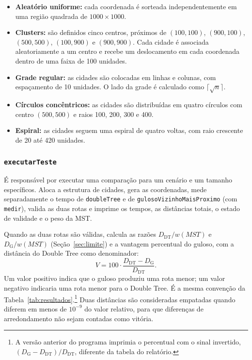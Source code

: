 \documentclass[11pt,a4paper]{article}
\renewcommand{\_}{\underscoreoriginal\allowbreak}
\begin{document}
\begin{itemize}
  \item \textbf{Aleatório uniforme:} cada coordenada é sorteada
    independentemente em uma região quadrada de $1000\times1000$.
  \item \textbf{Clusters:} são definidos cinco centros, próximos de
    $(100,100)$, $(900,100)$, $(500,500)$, $(100,900)$ e $(900,900)$.
    Cada cidade é associada aleatoriamente a um centro e recebe um
    deslocamento em cada coordenada dentro de uma faixa de 100 unidades.
  \item \textbf{Grade regular:} as cidades são colocadas em linhas e
    colunas, com espaçamento de 10 unidades. O lado da grade é calculado
    como $\lceil\sqrt{n}\rceil$.
  \item \textbf{Círculos concêntricos:} as cidades são distribuídas em
    quatro círculos com centro $(500,500)$ e raios 100, 200, 300 e 400.
  \item \textbf{Espiral:} as cidades seguem uma espiral de quatro
    voltas, com raio crescente de 20 até 420 unidades.
\end{itemize}

\subsubsection{\texttt{executarTeste}}

É responsável por executar uma comparação para um cenário e um tamanho
específicos. Aloca a estrutura de cidades, gera as coordenadas, mede
separadamente o tempo de \texttt{doubleTree} e de
\texttt{gulosoVizinhoMaisProximo} (com \texttt{medir}), valida as duas
rotas e imprime os tempos, as distâncias totais, o estado de validade e
o peso da MST.

Quando as duas rotas são válidas, calcula as razões
$D_{\text{DT}}/w(MST)$ e $D_{\text{G}}/w(MST)$ (Seção~\ref{sec:limite})
e a vantagem percentual do guloso, com a distância do Double Tree como
denominador:
\[
  V=100\cdot\frac{D_{\text{DT}}-D_{\text{G}}}{D_{\text{DT}}}.
\]
Um valor positivo indica que o guloso produziu uma rota menor; um valor
negativo indicaria uma rota menor para o Double Tree. É a mesma
convenção da Tabela~\ref{tab:resultados}.\footnote{A versão anterior do
programa imprimia o percentual com o sinal invertido,
$(D_{\text{G}}-D_{\text{DT}})/D_{\text{DT}}$, diferente da tabela do
relatório.} Duas distâncias são consideradas empatadas quando diferem
em menos de $10^{-9}$ do valor relativo, para que diferenças de
arredondamento não sejam contadas como vitória.
\end{document}

